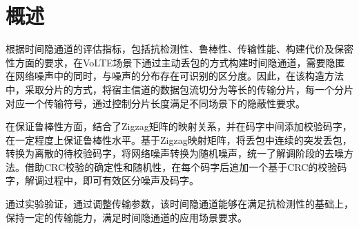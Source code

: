 \section{概述}
\label{chap:zigzag:overview}

根据时间隐通道的评估指标，包括抗检测性、鲁棒性、传输性能、构建代价及保密性方面的要求，在VoLTE场景下通过主动丢包的方式构建时间隐通道，需要隐匿在网络噪声中的同时，与噪声的分布存在可识别的区分度。因此，在该构造方法中，采取分片的方式，将宿主信道的数据包流切分为等长的传输分片，每一个分片对应一个传输符号，通过控制分片长度满足不同场景下的隐蔽性要求。

在保证鲁棒性方面，结合了Zigzag矩阵的映射关系，并在码字中间添加校验码字，在一定程度上保证鲁棒性水平。基于Zigzag映射矩阵，将丢包中连续的突发丢包，转换为离散的待校验码字，将网络噪声转换为随机噪声，统一了解调阶段的去噪方法。借助CRC校验的确定性和随机性，在每个码字后追加一个基于CRC的校验码字，解调过程中，即可有效区分噪声及码字。

通过实验验证，通过调整传输参数，该时间隐通道能够在满足抗检测性的基础上，保持一定的传输能力，满足时间隐通道的应用场景要求。